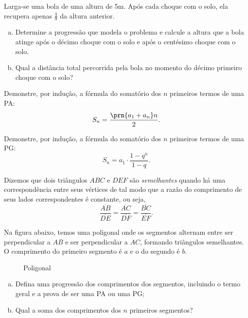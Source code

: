\begin{exercise}
    Larga-se uma bola de uma altura de 5m. Após cada choque com o
solo, ela recupera apenas $\frac 4 9 $ da altura anterior. 
%
\begin{enumerate}[a)]
    \item Determine a progressão que modela o problema e calcule 
    a altura que a bola atinge após o décimo choque com o solo
    e após o centésimo choque com o solo.
    \item Qual a distância total percorrida pela bola no momento 
    do décimo primeiro choque com o solo? 
\end{enumerate}
\end{exercise}

\begin{exercise}
	Demonstre, por indução, a fórmula do somatório dos $n$ primeiros termos de uma PA:
	\[S_n = \frac {\prn {a_1+a_n}n} 2.\]
\end{exercise}

\begin{exercise}
	Demonstre, por indução, a fórmula do somatório dos $n$ primeiros termos de uma PG:
	\[S_n = a_1 \cdot \frac{1-q^n}{1-q}.\]
\end{exercise}

\begin{exercise}
   Dizemos que dois triângulos $ABC$ e $DEF$ são \emph{semelhantes} quando há uma correspondência entre seus vértices de tal modo que a razão do comprimento de seus lados correspondentes é constante, ou seja,
   $$ \dfrac{\overline{AB}}{\overline{DE}} = \dfrac{\overline{AC}}{\overline{DF}} = \dfrac{\overline{BC}}{\overline{EF}}.$$

    Na figura abaixo, temos uma poligonal onde os segmentos alternam entre ser perpendicular a $AB$ e ser perpendicular a $AC$, formando triângulos semelhantes. O comprimento do primeiro segmento é $a$ e o do segundo é $b$.
    \begin{figure}[H]
	\centering
        \caption{Poligonal}
        \label{fig:my_label}
    \end{figure}
    \begin{enumerate}[a)]
        \item Defina uma progressão dos comprimentos dos segmentos, incluindo o termo geral e a prova de ser uma PA ou uma PG;
        \item Qual a soma dos comprimentos dos $n$ primeiros segmentos?
    \end{enumerate}
\end{exercise}

